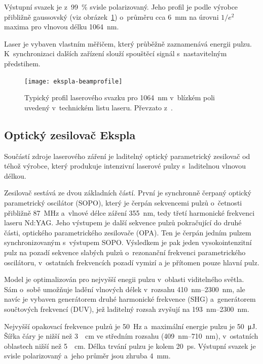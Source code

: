 Výstupní svazek je z~\SI{99}{\percent} svisle polarizovaný.
Jeho profil je podle výrobce přibližně gaussovský
(viz obrázek~\ref{fig:instruments-beamprofile})
o~průměru cca \SI{6}{\milli\metre} na úrovni $1/e^2$ maxima
pro vlnovou délku \SI{1064}{\nano\metre}.
\autocite{ekspla-datasheet}

Laser je vybaven vlastním měřičem, který průběžně zaznamenává energii pulzu.
K~synchronizaci dalších zařízení slouží spouštěcí signál s~nastavitelným
předstihem.\autocite{ekspla-datasheet}

\begin{figure}[htp]
	\centering
	\texttt{[image: ekspla-beamprofile]}
	\caption{Typický profil laserového svazku pro \SI{1064}{\nano\metre}
		v~blízkém poli uvedený v~technickém listu laseru.
		Převzato z~\cite{ekspla-datasheet}.}
	\label{fig:instruments-beamprofile}
\end{figure}

\subsection{Optický zesilovač Ekspla }
\label{sec:instruments-laser-amp}
Součástí zdroje laserového záření je laditelný optický parametrický
zesilovač  od téhož výrobce,
který produkuje intenzivní laserové pulzy s~laditelnou vlnovou délkou.

Zesilovač sestává ze dvou základních částí.
První je synchronně čerpaný optický parametrický oscilátor (SOPO),
který je čerpán sekvencemi pulzů o~četnosti přibližně \SI{87}{\mega\hertz}
a~vlnové délce záření \SI{355}{\nano\metre},
tedy třetí harmonické frekvenci laseru Nd:YAG.
Jeho výstupem je další sekvence pulzů pokračující do druhé části,
optického parametrického zesilovače (OPA).
Ten je čerpán jedním pulzem synchronizovaným s~výstupem SOPO.
Výsledkem je pak jeden vysokointenzitní pulz na pozadí sekvence slabých
pulzů o~rezonanční frekvenci parametrického oscilátoru,
v~ostatních frekvencích pozadí vymizí a je přítomen pouze hlavní pulz.
\autocite{ekspla-amp-datasheet}

Model  je optimalizován pro nejvyšší enegii pulzu
v~oblasti viditelného světla.
Sám o~sobě umožňuje ladění vlnových délek v~rozsahu
\SIrange{410}{2300}{\nano\metre},
ale navíc je vybaven generátorem druhé harmonické frekvence (SHG)
a~generátorem součtových frekvencí (DUV),
jež laditelný rozsah zvyšují na \SIrange{193}{2300}{\nano\metre}.

Nejvyšší opakovací frekvence pulzů je \SI{50}{\hertz}
a~maximální energie pulzu je \SI{50}{\micro\joule}.
Šířka čáry je nižší než \SI{3}{\per\centi\metre} ve středním rozsahu
(\SIrange{409}{710}{\nano\metre}),
v~ostatních oblastech nižší než \SI{5}{\per\centi\metre}.
Délka trvání pulzu je kolem \SI{20}{\pico\second}.
Výstupní svazek je svisle polarizovaný a~jeho průměr
jsou zhruba \SI{4}{\milli\metre}.
\autocite{ekspla-amp-datasheet}

